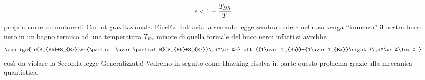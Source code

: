 $$
\epsilon<1-{T_{Bh}\over T}
$$
proprio come un motore di Carnot gravitazionale.
FineEx
Tuttavia la seconda legge sembra cadere nel caso venga ``immerso'' il nostro buco nero in un bagno termico ad una temperatura $T_{Ex}$ minore di quella formale del buco nero: infatti si avrebbe
$$
\eqalign{
d(S_{Bh}+S_{Ex})&={\partial\over \partial M}(S_{Bh}+S_{Ex})\,dM\cr
&=\left({1\over T_{Bh}}-{1\over T_{Ex}}\right)\,dM\cr
&\leq 0
}
$$
cos\'\i\ da violare la Seconda legge Generalizzata! Vedremo in seguito come Hawking risolva in parte questo problema grazie alla meccanica quantistica.


